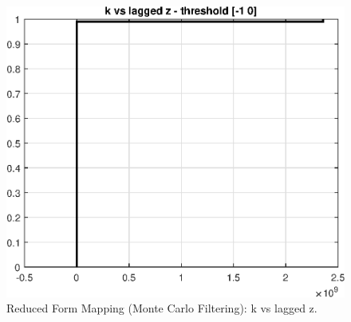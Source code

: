 
\begin{figure}[H]
\centering 
\includegraphics[width=1.00\textwidth]{RBC_kz/gsa/redform_prior/k_vs_z_threshold/RBC_kz_prior_k_vs_z}
\caption{Reduced Form Mapping (Monte Carlo Filtering): k vs lagged z.}\label{Fig:prior_k_vs_z}
\end{figure}

